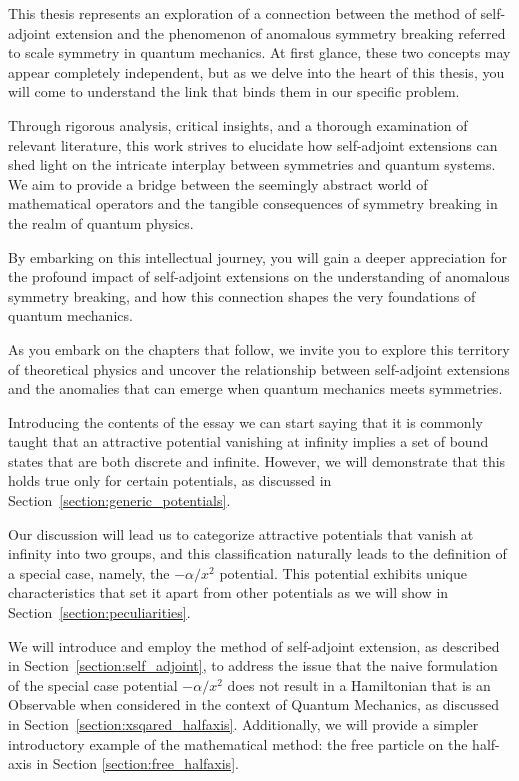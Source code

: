 This thesis represents an exploration of a connection between the method of self-adjoint extension and the phenomenon of anomalous symmetry breaking referred to scale symmetry in quantum mechanics. At first glance, these two concepts may appear completely independent, but as we delve into the heart of this thesis, you will come to understand the link that binds them in our specific problem.

Through rigorous analysis, critical insights, and a thorough examination of relevant literature, this work strives to elucidate how self-adjoint extensions can shed light on the intricate interplay between symmetries and quantum systems. We aim to provide a bridge between the seemingly abstract world of mathematical operators and the tangible consequences of symmetry breaking in the realm of quantum physics.

By embarking on this intellectual journey, you will gain a deeper appreciation for the profound impact of self-adjoint extensions on the understanding of anomalous symmetry breaking, and how this connection shapes the very foundations of quantum mechanics.

As you embark on the chapters that follow, we invite you to explore this territory of theoretical physics and uncover the relationship between self-adjoint extensions and the anomalies that can emerge when quantum mechanics meets symmetries.

\vspace{4mm}
\noindent
Introducing the contents of the essay we can start saying that it is commonly taught that an attractive potential vanishing at infinity implies a set of bound states that are both discrete and infinite. 
However, we will demonstrate that this holds true only for certain potentials, as discussed in Section~\ref{section:generic_potentials}.

Our discussion will lead us to categorize attractive potentials that vanish at infinity into two groups, and this classification naturally leads to the definition of a special case, namely, the $-\alpha/x^2$ potential. 
This potential exhibits unique characteristics that set it apart from other potentials as we will show in Section~\ref{section:peculiarities}.

We will introduce and employ the method of self-adjoint extension, as described in Section~\ref{section:self_adjoint}, to address the issue that the naive formulation of the special case potential $-\alpha/x^2$ does not result in a Hamiltonian that is an Observable when considered in the context of Quantum Mechanics, as discussed in Section~\ref{section:xsqared_halfaxis}.
Additionally, we will provide a simpler introductory example of the mathematical method: the free particle on the half-axis in Section \ref{section:free_halfaxis}.

